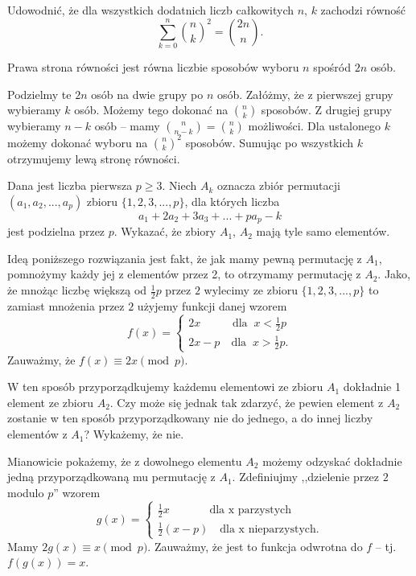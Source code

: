 \newpage

\begin{problem}{3} 
	Udowodnić, że dla wszystkich dodatnich liczb całkowitych $n$, $k$ zachodzi równość
	\[
	    \sum^{n}_{k=0} {{n}\choose{k}}^2 = {{2n}\choose{n}}.
	\]
\end{problem}

\vspace{5px}

\noindent
Prawa strona równości jest równa liczbie sposobów wyboru $n$ spośród $2n$ osób.

Podzielmy te $2n$ osób na dwie grupy po $n$ osób. Załóżmy, że z pierwszej grupy wybieramy $k$ osób. Możemy tego dokonać na ${n}\choose{k}$ sposobów. Z drugiej grupy wybieramy $n - k$ osób -- mamy ${{n}\choose{n - k}} = {{n}\choose{k}}$ możliwości. Dla ustalonego $k$ możemy dokonać wyboru na ${{n}\choose{k}}^2$ sposobów. Sumując po wszystkich $k$ otrzymujemy lewą stronę równości.

\begin{problem}{4}
	Dana jest liczba pierwsza $p \geqslant 3$. Niech $A_k$ oznacza zbiór permutacji $(a_1, a_2, ..., a_p)$ zbioru $\{1, 2, 3,..., p\}$, dla których liczba
	\[
		a_1 + 2a_2 + 3a_3 + ... + pa_p - k
	\]
	jest podzielna przez $p$. Wykazać, że zbiory $A_1$, $A_2$ mają tyle samo elementów.
\end{problem}

\vspace{5px}

\noindent
Ideą poniższego rozwiązania jest fakt, że jak mamy pewną permutację z $A_1$, pomnożymy każdy jej z elementów przez 2, to otrzymamy permutację z $A_2$. Jako, że mnożąc liczbę większą od $\frac{1}{2}p$ przez $2$ wylecimy ze zbioru $\{1, 2, 3,..., p\}$ to zamiast mnożenia przez $2$ użyjemy funkcji danej wzorem
\[
	f(x) = 
	\begin{cases}
	2x \;\;\; \quad\quad\text{dla} \;\; x < \frac{1}{2}p\\
	2x - p \quad \text{dla} \;\; x > \frac{1}{2}p.
	\end{cases}
\]
Zauważmy, że $f(x) \equiv 2x \pmod{p}$.

W ten sposób przyporządkujemy każdemu elementowi ze zbioru $A_1$ dokładnie 1 element ze zbioru $A_2$. Czy może się jednak tak zdarzyć, że pewien element z $A_2$ zostanie w ten sposób przyporządkowany nie do jednego, a do innej liczby elementów z $A_1$? Wykażemy, że nie.

Mianowicie pokażemy, że z dowolnego elementu $A_2$ możemy odzyskać dokładnie jedną przyporządkowaną mu permutację z $A_1$. Zdefiniujmy ,,dzielenie przez $2$ modulo $p$'' wzorem
\[
	g(x) = 
	\begin{cases}
	\frac{1}{2}x \;\; \quad\quad\quad\text{dla x parzystych}\\
	\frac{1}{2}(x - p) \quad \text{dla x nieparzystych}.
	\end{cases}
\]
Mamy $2g(x) \equiv x \pmod{p}$.
Zauważmy, że jest to funkcja odwrotna do $f$ -- tj. $f(g(x)) = x$.

